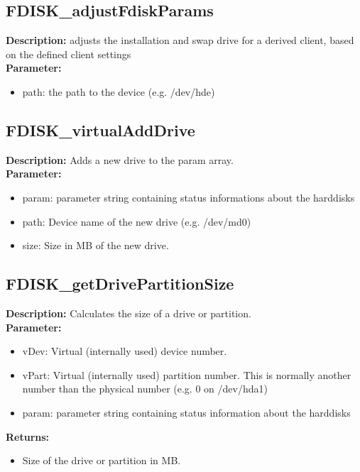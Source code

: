 \subsection{FDISK\_adjustFdiskParams}
\textbf{Description:} adjusts the installation and swap drive for a derived client, based on the defined client settings\\
\textbf{Parameter:}
\begin{itemize}
\item path: the path to the device (e.g. /dev/hde)
\end{itemize}

\subsection{FDISK\_virtualAddDrive}
\textbf{Description:} Adds a new drive to the param array.\\
\textbf{Parameter:}
\begin{itemize}
\item param: parameter string containing status informations about the harddisks
\item path: Device name of the new drive (e.g. /dev/md0)
\item size: Size in MB of the new drive.
\end{itemize}

\subsection{FDISK\_getDrivePartitionSize}
\textbf{Description:} Calculates the size of a drive or partition.\\
\textbf{Parameter:}
\begin{itemize}
\item vDev: Virtual (internally used) device number.
\item vPart: Virtual (internally used) partition number. This is normally another number than the physical number (e.g. 0 on /dev/hda1)
\item param: parameter string containing status information about the harddisks
\end{itemize}
\textbf{Returns:}
\begin{itemize}
\item Size of the drive or partition in MB.
\end{itemize}

